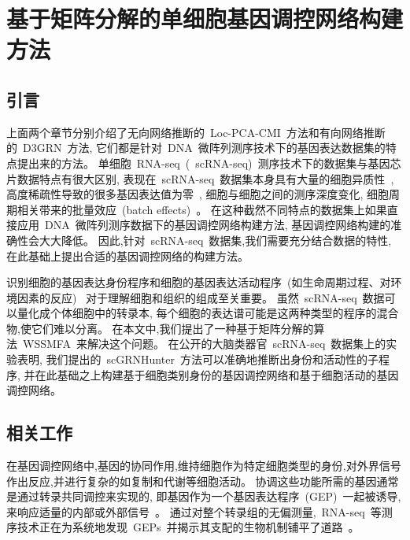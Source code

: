 \section{基于矩阵分解的单细胞基因调控网络构建方法}
\label{sec:scgrnhunter}

\subsection{引言}


上面两个章节分别介绍了无向网络推断的~Loc-PCA-CMI~方法和有向网络推断的~D3GRN~方法, 
它们都是针对~DNA~微阵列测序技术下的基因表达数据集的特点提出来的方法。
单细胞~RNA-seq~(~scRNA-seq)~测序技术下的数据集与基因芯片数据特点有很大区别, 
表现在~scRNA-seq~数据集本身具有大量的细胞异质性~\cite{wagner2016revealing},
高度稀疏性导致的很多基因表达值为零~\cite{vallejos2017normalizing},
细胞与细胞之间的测序深度变化, 细胞周期相关带来的批量效应~(batch effects)~\cite{buettner2015computational}。
在这种截然不同特点的数据集上如果直接应用~DNA~微阵列测序数据下的基因调控网络构建方法,
基因调控网络构建的准确性会大大降低。
因此,针对~scRNA-seq~数据集,我们需要充分结合数据的特性,
在此基础上提出合适的基因调控网络的构建方法。

识别细胞的基因表达身份程序和细胞的基因表达活动程序~(如生命周期过程、对环境因素的反应)~
对于理解细胞和组织的组成至关重要。
虽然~scRNA-seq~数据可以量化成个体细胞中的转录本,
每个细胞的表达谱可能是这两种类型的程序的混合物,使它们难以分离。
在本文中,我们提出了一种基于矩阵分解的算法~WSSMFA~来解决这个问题。
在公开的大脑类器官~scRNA-seq~数据集上的实验表明,
我们提出的~scGRNHunter~方法可以准确地推断出身份和活动性的子程序, 
并在此基础之上构建基于细胞类别身份的基因调控网络和基于细胞活动的基因调控网络。

\subsection{相关工作}
在基因调控网络中,基因的协同作用,维持细胞作为特定细胞类型的身份,对外界信号作出反应,并进行复杂的如复制和代谢等细胞活动。
协调这些功能所需的基因通常是通过转录共同调控来实现的,
即基因作为一个基因表达程序~(GEP)~一起被诱导,
来响应适量的内部或外部信号~\cite{eisen1998cluster,segal2003module}。
通过对整个转录组的无偏测量,~RNA-seq~等测序技术正在为系统地发现~GEPs~并揭示其支配的生物机制铺平了道路~\cite{liberzon2015molecular}。


